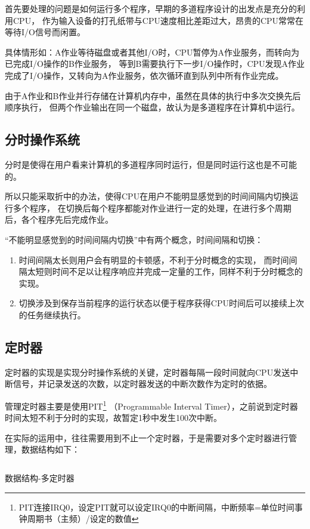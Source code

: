 首先要处理的问题是如何运行多个程序，早期的多道程序设计的出发点是充分的利用CPU，
作为输入设备的打孔纸带与CPU速度相比差距过大，昂贵的CPU常常在等待I/O信号而闲置。

具体情形如：A作业等待磁盘或者其他I/O时，CPU暂停为A作业服务，而转向为已完成I/O操作的B作业服务，
等到B需要执行下一步I/O操作时，CPU发现A作业完成了I/O操作，又转向为A作业服务，依次循环直到队列中所有作业完成。

由于A作业和B作业并行存储在计算机内存中，虽然在具体的执行中多次交换先后顺序执行，
但两个作业输出在同一个磁盘，故认为是多道程序在计算机中运行。

\subsection{分时操作系统}

分时是使得在用户看来计算机的多道程序同时运行，但是同时运行这也是不可能的。

所以只能采取折中的办法，使得CPU在用户不能明显感觉到的时间间隔内切换运行多个程序，
在切换后每个程序都能对作业进行一定的处理，在进行多个周期后，各个程序先后完成作业。

“不能明显感觉到的时间间隔内切换”中有两个概念，时间间隔和切换：

\begin{enumerate}
\item 时间间隔太长则用户会有明显的卡顿感，不利于分时概念的实现，
  而时间间隔太短则时间不足以让程序响应并完成一定量的工作，同样不利于分时概念的实现。
\item 切换涉及到保存当前程序的运行状态以便于程序获得CPU时间后可以接续上次的任务继续执行。
\end{enumerate}

\subsection{定时器}

定时器的实现是实现分时操作系统的关键，定时器每隔一段时间就向CPU发送中断信号，并记录发送的次数，以定时器发送的中断次数作为定时的依据。

管理定时器主要是使用PIT\footnote{PIT连接IRQ0，设定PIT就可以设定IRQ0的中断间隔，中断频率=单位时间事钟周期书（主频）/设定的数值}
（Programmable Interval Timer），之前说到定时器时间太短不利于分时的实现，故暂定1秒中发生100次中断。

在实际的运用中，往往需要用到不止一个定时器，于是需要对多个定时器进行管理，数据结构如下：

\begin{listing}[H]
  \inputminted[tabsize=2, firstline=175, lastline=187,
    linenos=true]{c}{../ZOS/src/kernel/bootpack.h}
  \caption{数据结构-多定时器}
  \label{lst:multi_timer}
\end{listing}


